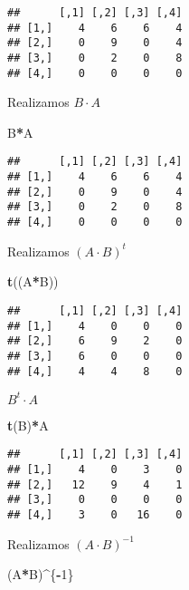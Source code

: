 \documentclass[
]{article}
\newenvironment{Shaded}{\begin{snugshade}}{\end{snugshade}}
\newcommand{\DecValTok}[1]{\textcolor[rgb]{0.00,0.00,0.81}{#1}}
\newcommand{\KeywordTok}[1]{\textcolor[rgb]{0.13,0.29,0.53}{\textbf{#1}}}
\newcommand{\NormalTok}[1]{#1}
\newcommand{\OperatorTok}[1]{\textcolor[rgb]{0.81,0.36,0.00}{\textbf{#1}}}
\begin{document}
\begin{verbatim}
##      [,1] [,2] [,3] [,4]
## [1,]    4    6    6    4
## [2,]    0    9    0    4
## [3,]    0    2    0    8
## [4,]    0    0    0    0
\end{verbatim}

Realizamos \(B\cdot A\)

\begin{Shaded}
\begin{Highlighting}[]
\NormalTok{B}\OperatorTok{*}\NormalTok{A}
\end{Highlighting}
\end{Shaded}

\begin{verbatim}
##      [,1] [,2] [,3] [,4]
## [1,]    4    6    6    4
## [2,]    0    9    0    4
## [3,]    0    2    0    8
## [4,]    0    0    0    0
\end{verbatim}

Realizamos \((A\cdot B)^t\)

\begin{Shaded}
\begin{Highlighting}[]
\KeywordTok{t}\NormalTok{((A}\OperatorTok{*}\NormalTok{B))}
\end{Highlighting}
\end{Shaded}

\begin{verbatim}
##      [,1] [,2] [,3] [,4]
## [1,]    4    0    0    0
## [2,]    6    9    2    0
## [3,]    6    0    0    0
## [4,]    4    4    8    0
\end{verbatim}

\(B^t\cdot A\)

\begin{Shaded}
\begin{Highlighting}[]
\KeywordTok{t}\NormalTok{(B)}\OperatorTok{*}\NormalTok{A}
\end{Highlighting}
\end{Shaded}

\begin{verbatim}
##      [,1] [,2] [,3] [,4]
## [1,]    4    0    3    0
## [2,]   12    9    4    1
## [3,]    0    0    0    0
## [4,]    3    0   16    0
\end{verbatim}

Realizamos \((A\cdot B)^{-1}\)

\begin{Shaded}
\begin{Highlighting}[]
\NormalTok{(A}\OperatorTok{*}\NormalTok{B)}\OperatorTok{^}\NormalTok{\{}\OperatorTok{-}\DecValTok{1}\NormalTok{\}}
\end{Highlighting}
\end{Shaded}
\end{document}
